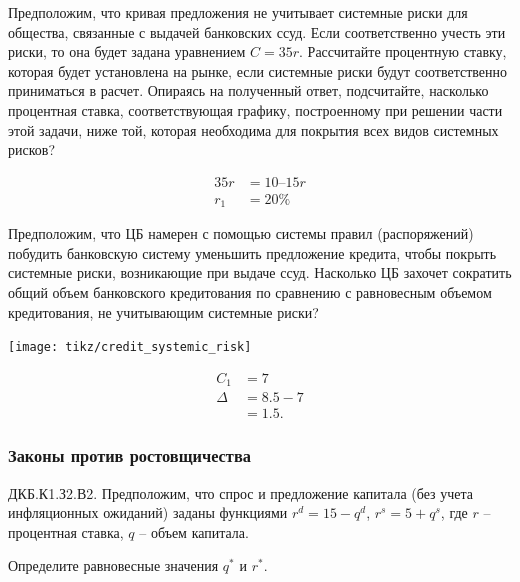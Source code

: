 \documentclass[12pt, table, a4paper,twoside]{exam}
\begin{document}
\begin{questions}
\begin{subparts}
	\subpart[5] Предположим, что кривая предложения не учитывает системные риски для общества, связанные с выдачей банковских ссуд. Если соответственно учесть эти риски, то она будет задана уравнением $C = 35r$. Рассчитайте процентную ставку, которая будет установлена на рынке, если системные риски будут соответственно приниматься в расчет. Опираясь на полученный ответ, подсчитайте, насколько процентная ставка, соответствующая графику, построенному при решении части этой задачи, ниже той, которая необходима для покрытия всех видов системных рисков?

	\begin{solution}[12em]
	\begin{align*}
	35r &= 10 – 15r\\
	r_1 &= 20\%
	\end{align*}
		
	\end{solution}

	\vfill\null\pagebreak
	\subpart[10] Предположим, что ЦБ намерен с помощью системы правил (распоряжений) побудить банковскую систему уменьшить предложение кредита, чтобы покрыть системные риски, возникающие при выдаче ссуд. Насколько ЦБ захочет сократить общий объем банковского кредитования по сравнению с равновесным объемом кредитования, не учитывающим системные риски?
	
	\begin{solution}[12em]
		
	\centering
	\texttt{[image: tikz/credit\_systemic\_risk]}
	
	\raggedright
	\begin{align*}
	C_1 &= 7\\
	\Delta&=8.5-7\\
	&=1.5.
	\end{align*}		
	\end{solution}
	
\end{subparts}
\addpoints

\subsubsection{Законы против ростовщичества}
\question[10] ДКБ.К1.З2.В2. Предположим, что спрос и предложение капитала (без учета инфляционных ожиданий) заданы функциями 	
$r^d=15 - q^d$, $r^s= 5 + q^s$, где 	
$r$ – процентная ставка, 	
$q$ – объем капитала.	
\noaddpoints
\begin{subparts}
	\subpart[3] Определите равновесные значения $q^*$ и $r^*$.
	

\end{subparts}
\end{questions}
\end{document}

